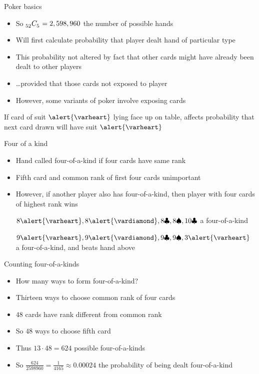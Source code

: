 \documentclass[handout]{beamer}
\theoremstyle{definition}
\newcommand\ncr[2]{\tensor[_{#1}]C{_{#2}}}
\newcommand{\hs}{\alert{\varheart}}
\newcommand{\ds}{\alert{\vardiamond}}
\newcommand{\s}{\spadesuit}
\newcommand{\cs}{\clubsuit}
\begin{document}
\begin{frame}{Poker basics}
\begin{itemize}
\item So $\ncr{52}{5}=2,598,960$ the number of possible hands
\item Will first calculate probability that player dealt
hand of particular type
\item This probability not altered by fact that other cards
might have already been dealt to other players
\item \dots provided that those cards \alert{not exposed to player}
\item However, some variants of poker involve exposing cards
\end{itemize}
\begin{example}
If card of suit $\hs$ lying face up on table, affects probability
that next card drawn will have suit $\hs$
\end{example}
\end{frame}

\begin{frame}{Four of a kind}
\begin{itemize}
\item Hand called \alert{four-of-a-kind} if four cards have
same rank
\item Fifth card and common rank of first four cards unimportant
\item However, if another player also has four-of-a-kind,
then player with four cards of highest rank wins
\begin{example} $8\hs,8\ds,8\cs,8\s,10\cs$ a four-of-a-kind\end{example}
\begin{example} $9\hs,9\ds,9\cs,9\s,3\hs$ a four-of-a-kind,
and beats hand above\end{example}
\end{itemize}
\end{frame}

\begin{frame}{Counting four-of-a-kinds }
\begin{itemize}
\item How many ways to form four-of-a-kind?
\item Thirteen ways to choose common rank of four cards
\item $48$ cards have rank different from common rank
\item So $48$ ways to choose fifth card
\item Thus $13\cdot 48=624$ possible four-of-a-kinds
\item So $\frac{624}{2598960}=\frac{1}{4165}\approx 0.00024$
the probability of being dealt four-of-a-kind
\end{itemize}
\end{frame}
\end{document}
